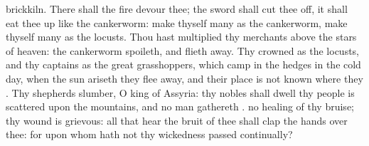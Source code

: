 {brickkiln.
There shall the
fire
devour thee; the
sword shall cut thee
off, it shall eat thee
up like the
cankerworm: make thyself
many as the
cankerworm, make thyself
many as the
locusts.
Thou hast
multiplied thy
merchants above the
stars of
heaven: the
cankerworm
spoileth, and flieth
away.
Thy
crowned
{} as the
locusts, and thy
captains as the great
grasshoppers, which
camp in the
hedges in the
cold
day,
{} when the
sun
ariseth they flee
away, and their
place is not
known
where they
{}.
Thy
shepherds
slumber, O
king of
Assyria: thy
nobles shall
dwell
{} thy
people is
scattered upon the
mountains, and no man
gathereth
{}.
 no
healing of thy
bruise; thy
wound is
grievous: all that
hear the
bruit of thee shall
clap the
hands over thee: for upon whom hath not thy
wickedness
passed
continually?
\par }
